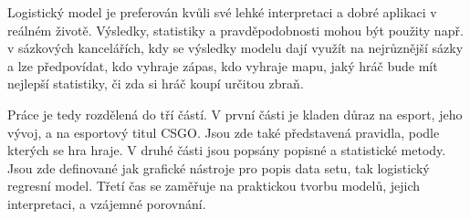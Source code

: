 Logistický model je preferován kvůli své lehké interpretaci a 
dobré aplikaci v reálném životě. Výsledky, statistiky a pravděpodobnosti mohou být použity např. v sázkových kancelářích, kdy se výsledky modelu
dají využít na nejrůznější sázky 
{\color{red}
a lze předpovídat,
}
kdo vyhraje zápas, kdo vyhraje mapu, jaký hráč bude mít nejlepší statistiky, či zda si hráč koupí určitou zbraň.

{\color{red}
Práce je tedy rozdělená do tří částí. V první části je kladen důraz na esport, jeho vývoj, a na esportový titul \ac{CSGO}. Jsou zde také představená pravidla, podle kterých se
hra hraje. V druhé části jsou popsány popisné a statistické metody. Jsou zde definované jak grafické nástroje pro popis data setu, tak logistický regresní model. Třetí čas se
zaměřuje na praktickou tvorbu modelů, jejich interpretaci, a vzájemné porovnání.
}
